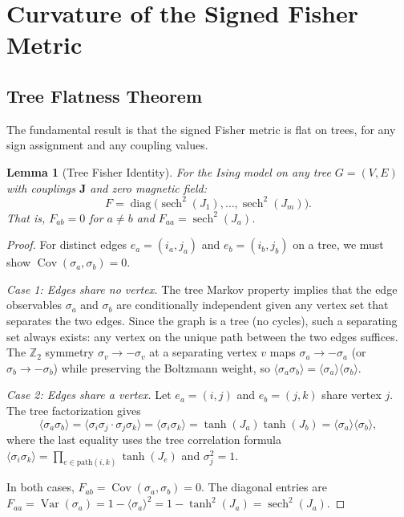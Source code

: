 \documentclass[11pt]{article}
\newtheorem{lemma}[theorem]{Lemma}
\theoremstyle{definition}
\theoremstyle{remark}
\newcommand{\Fish}{F}
\newcommand{\coupl}{\mathbf{J}}
\newcommand{\Cov}{\operatorname{Cov}}
\newcommand{\Var}{\operatorname{Var}}
\newcommand{\diag}{\operatorname{diag}}
\newcommand{\sech}{\operatorname{sech}}
\newcommand{\edgeo}{\sigma}
\begin{document}
\section{Curvature of the Signed Fisher Metric}
\label{sec:curvature}

\subsection{Tree Flatness Theorem}
\label{subsec:tree-flat}

The fundamental result is that the signed Fisher metric is flat on
trees, for any sign assignment and any coupling values.

\begin{lemma}[Tree Fisher Identity]
\label{lem:tree-fisher}
For the Ising model on any tree $G = (V, E)$ with couplings $\coupl$
and zero magnetic field:
\begin{equation}
  \Fish = \diag\bigl(\sech^2(J_1), \ldots, \sech^2(J_m)\bigr).
  \label{eq:tree-fisher-identity}
\end{equation}
That is, $\Fish_{ab} = 0$ for $a \neq b$ and $\Fish_{aa} = \sech^2(J_a)$.
\end{lemma}

\begin{proof}
For distinct edges $e_a = (i_a, j_a)$ and $e_b = (i_b, j_b)$ on a tree,
we must show $\Cov(\edgeo_a, \edgeo_b) = 0$.

\textit{Case 1: Edges share no vertex.} The tree Markov property implies
that the edge observables $\edgeo_a$ and $\edgeo_b$ are conditionally
independent given any vertex set that separates the two edges. Since the
graph is a tree (no cycles), such a separating set always exists: any
vertex on the unique path between the two edges suffices. The $\mathbb{Z}_2$
symmetry $\sigma_v \to -\sigma_v$ at a separating vertex $v$ maps
$\edgeo_a \to -\edgeo_a$ (or $\edgeo_b \to -\edgeo_b$) while preserving
the Boltzmann weight, so $\langle \edgeo_a \edgeo_b \rangle = \langle \edgeo_a\rangle
\langle \edgeo_b\rangle$.

\textit{Case 2: Edges share a vertex.} Let $e_a = (i, j)$ and
$e_b = (j, k)$ share vertex $j$. The tree factorization gives
\[
  \langle \edgeo_a \edgeo_b \rangle
  = \langle \sigma_i \sigma_j \cdot \sigma_j \sigma_k \rangle
  = \langle \sigma_i \sigma_k \rangle
  = \tanh(J_a) \tanh(J_b)
  = \langle \edgeo_a \rangle \langle \edgeo_b \rangle,
\]
where the last equality uses the tree correlation formula
$\langle \sigma_i \sigma_k \rangle = \prod_{e \in \text{path}(i,k)} \tanh(J_e)$
and $\sigma_j^2 = 1$.

In both cases, $\Fish_{ab} = \Cov(\edgeo_a, \edgeo_b) = 0$.
The diagonal entries are $\Fish_{aa} = \Var(\edgeo_a) = 1 - \langle \edgeo_a\rangle^2
= 1 - \tanh^2(J_a) = \sech^2(J_a)$.
\end{proof}
\end{document}
